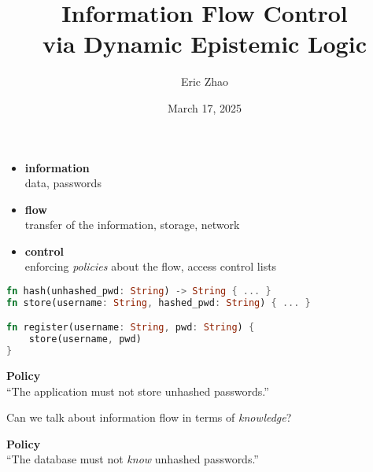 \documentclass[14pt, aspectratio=169, xcolor={dvipsnames}]{beamer}
\title{Information Flow Control \\ via Dynamic Epistemic Logic}
\author{
  Eric Zhao
}
\institute{Brown University}
\date{March 17, 2025}
\begin{document}
{
  \begin{frame}
    \titlepage
  \end{frame}
}

\begin{frame}[c]
  \begin{itemize}
    \item \textbf{information} \\ data, \eg passwords
      \pause

    \item \textbf{flow} \\ transfer of the information, \eg storage, network
      \pause

    \item \textbf{control} \\ enforcing \emph{policies} about the flow, \eg access control lists
  \end{itemize}
\end{frame}

\begin{frame}[fragile, b]
  \begin{lstlisting}[language=Rust]
fn hash(unhashed_pwd: String) -> String { ... }
fn store(username: String, hashed_pwd: String) { ... }

fn register(username: String, pwd: String) {
    store(username, pwd)
}
  \end{lstlisting}

  \vspace{1.5em}
  \pause
  \begin{center}
    \textbf{Policy} \\
    ``The application must not store unhashed passwords.''
  \end{center}
\end{frame}

\begin{frame}[b]
  \begin{center}
    \large
    Can we talk about information flow in terms of \emph{knowledge}? \\
  \end{center}

  \vspace{1.5em}
  \pause
  \begin{center}
    \textbf{Policy} \\
    ``The database must not \emph{know} unhashed passwords.''
  \end{center}
\end{frame}
\end{document}
